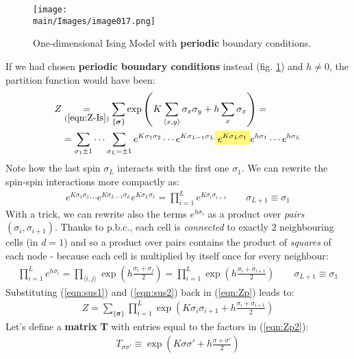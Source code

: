 \documentclass[../../main.tex]{subfiles}
\begin{document}
\begin{figure}[H]
    \centering
    \texttt{[image: \\main/Images/image017.png]}
    \caption{One-dimensional Ising Model with \textbf{periodic} boundary conditions.\label{fig:pbcd1}}
\end{figure}

If we had chosen \textbf{periodic boundary conditions} instead (fig. \ref{fig:pbcd1}) and $h\neq 0$, the partition function would have been:
\begin{align}\label{eqn:Zp}
    Z &\underset{(\ref{eqn:Z-Is})}{=}  \sum_{\{\bm{\sigma}\}} \exp\left(K \sum_{\langle x,y \rangle} \sigma_x \sigma_y + h \sum_x \sigma_x\right)  =\\
    &= \sum_{\sigma_1 \pm 1} \cdots \sum_{\sigma_L = \pm 1} e^{K \sigma_1 \sigma_2} \cdots e^{K \sigma_{L-1} \sigma_L} \hlc{Yellow}{e^{K \sigma_{L} \sigma_{1}} }e^{h \sigma_1} \cdots e^{h \sigma_L}
\end{align} 
Note how the last spin $\sigma_L$ interacts with the first one $\sigma_1$. We can rewrite the spin-spin interactions more compactly as:
\begin{align}\label{eqn:sus1}
    e^{K \sigma_1 \sigma_2} \cdots e^{K \sigma_{L-1} \sigma_L} e^{K \sigma_{L} \sigma_{1}} = \prod_{i=1}^L e^{K \sigma_i \sigma_{i+1}} \qquad \sigma_{L+1} \equiv \sigma_1
\end{align}
With a trick, we can rewrite also the terms $e^{h \sigma_i}$ as a product over \textit{pairs} $(\sigma_i, \sigma_{i+1})$. Thanks to p.b.c., each cell is \textit{connected} to exactly $2$ neighbouring cells (in $d=1$) and so a product over pairs contains the product of \textit{squares} of each node - because each cell is multiplied by itself once for every neighbour: 
\begin{align}\label{eqn:sus2}
    \prod_{i=1}^L e^{h \sigma_i} = \prod_{\langle i, j \rangle} \exp\left(h \frac{\sigma_i + \sigma_j}{2} \right) = \prod_{i=1}^L \exp\left(h \frac{\sigma_i + \sigma_{i+1}}{2} \right) \qquad \sigma_{L+1} \equiv \sigma_1
\end{align}
Substituting (\ref{eqn:sus1}) and (\ref{eqn:sus2}) back in (\ref{eqn:Zp}) leads to:
\begin{align} \label{eqn:Zp2}
    Z = \sum_{\{\bm{\sigma}\}} \prod_{i=1}^L \exp\left(K \sigma_i \sigma_{i+1} + h \frac{\sigma_i + \sigma_{i+1}}{2} \right)
\end{align}
Let's define a \textbf{matrix} \textbf{T}  with entries equal to the factors in (\ref{eqn:Zp2}):
\begin{align}\label{eqn:transfer-elements}
    T_{\sigma \sigma'} \equiv \exp\left(K \sigma \sigma' + h \frac{\sigma + \sigma'}{2} \right)
\end{align}
\end{document}
